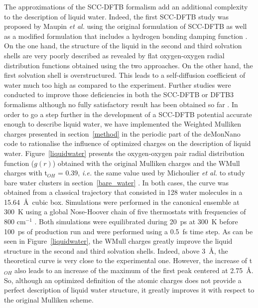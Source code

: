 \documentclass[]{interact}
\theoremstyle{plain}%
\theoremstyle{definition}
\theoremstyle{remark}
\begin{document}
The approximations of the SCC-DFTB formalism add an additional complexity to the description of liquid water. Indeed, the
first SCC-DFTB study was proposed by Maupin \textit{et al.} using the original formulation of SCC-DFTB as well as a modified
formulation that includes a hydrogen bonding damping function \cite{Maupin2010}. On the one hand, the structure of the liquid in the
second and third solvation shells are very poorly described as revealed by flat oxygen-oxygen radial distribution functions
obtained using the two approaches. On the other hand, the first solvation shell is overstructured. This leads to a self-diffusion
coefficient of water much too high as compared to the experiment. Further studies were conducted to improve those
deficiencies in both the SCC-DFTB or DFTB3 formalisms \cite{Goyal2011,Goyal2014} although no fully satisfactory 
result has been obtained so far \cite{Choi2013,Liang2014}. In order to go a step further in the development of a 
SCC-DFTB potential accurate enough to describe liquid water, we have implemented the Weighted Mulliken charges 
presented in section~\ref{method} in the periodic part of the deMonNano code to rationalise the influence of 
optimized charges on the description of liquid water. Figure~\ref{liquidwater} presents the oxygen-oxygen pair radial
distribution function ($g(r)$) obtained  with the original Mulliken charges and the WMull charges with t$_{OH}$ = 0.39,
\textit{i.e.} the same value used by Michoulier \textit{et al.} to study bare water clusters in section~\ref{bare_water}
\cite{Michoulier18b}. In both cases, the curve was obtained from a classical trajectory that consisted in 128 water molecules in a
15.64~\AA~cubic box. Simulations were performed in the canonical ensemble at 300~K using a global Nose-Hoover chain of five
thermostats with frequencies of 800 cm$^{-1}$ \cite{Nose1984,Hoover1985}. Both simulations were equilibrated during
20~ps at 300~K before 100~ps of production run and were performed using a 0.5~fs time step. As can be seen in
Figure~\ref{liquidwater}, the WMull charges greatly improve the liquid structure in the second and third solvation shells. Indeed,
above 3~\AA, the theoretical curve is very close to the experimental one. However, the increase of t$_{OH}$ also leads
to an increase of the maximum of the first peak centered at 2.75~\AA. So, although an optimized definition of the atomic
charges does not provide a perfect description of liquid water structure, it greatly improves it with respect to the original
Mulliken scheme.  
\end{document}
